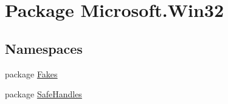 \hypertarget{namespace_microsoft_1_1_win32}{\section{Package Microsoft.\-Win32}
\label{namespace_microsoft_1_1_win32}
}
\subsection*{Namespaces}
\begin{DoxyCompactItemize}
\item 
package \hyperlink{namespace_microsoft_1_1_win32_1_1_fakes}{Fakes}
\item 
package \hyperlink{namespace_microsoft_1_1_win32_1_1_safe_handles}{Safe\-Handles}
\end{DoxyCompactItemize}
